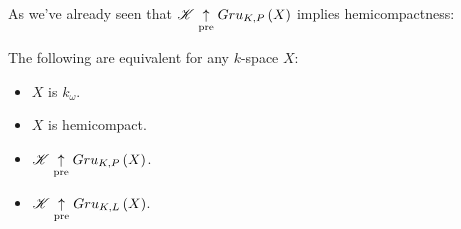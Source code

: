 As we've already seen that $\mathscr{K} \underset{\text{pre}}{\uparrow} Gru_{K,P}\left({X}\right)$ implies
hemicompactness:

\begin{cor}
  The following are equivalent for any $k$-space $X$:
    \begin{itemize}
      \item $X$ is $k_{\omega}$.
      \item $X$ is hemicompact.
      \item $\mathscr{K} \underset{\text{pre}}{\uparrow} Gru_{K,P}\left({X}\right)$.
      \item $\mathscr{K} \underset{\text{pre}}{\uparrow} Gru_{K,L}\left({X}\right)$.
    \end{itemize}
\end{cor}












